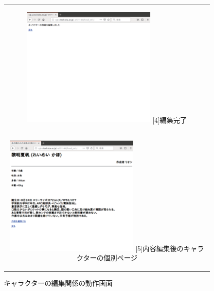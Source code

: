 \documentclass[12pt,a4paper]{jarticle}
\begin{document}
\begin{ttfamily}
\begin{figure}[htbp]
\begin{center}
\begin{tabular}{c}
      \begin{minipage}{0.55\hsize}
        \begin{center}
          \includegraphics[width=6.7cm]{10-3-28.eps}
          \hspace{1.6cm} [4]編集完了
        \end{center}
      \end{minipage}

      \begin{minipage}{0.55\hsize}
        \vspace{90mm}
      \end{minipage} \\

      \begin{minipage}{0.55\hsize}
        \begin{center}
          \includegraphics[width=6.7cm]{10-3-29.eps}
          \hspace{1.6cm} [5]内容編集後のキャラクターの個別ページ
        \end{center}
      \end{minipage}

    \end{tabular}
    \caption{キャラクターの編集関係の動作画面}
    \label{fig:b}
  \end{center}
\end{figure}


\end{ttfamily}
\end{document}
